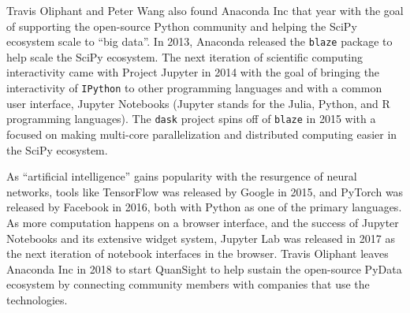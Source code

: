 \documentclass[010-intro.tex]{subfiles}
\begin{document}
        Travis Oliphant and Peter Wang also found Anaconda Inc that year
        with the goal of supporting the open-source Python community and helping the SciPy ecosystem scale to ``big data''. %
        In 2013, Anaconda released the \lstinline{blaze} package to help scale the SciPy ecosystem.
        The next iteration of scientific computing interactivity came with Project Jupyter in 2014
        with the goal of bringing the interactivity of \lstinline{IPython} to other programming languages and with a common user interface,
        Jupyter Notebooks (Jupyter stands for the Julia, Python, and R programming languages).
        The \lstinline{dask} project spins off of \lstinline{blaze} in 2015 with a focused on
        making multi-core parallelization and distributed computing easier in the SciPy ecosystem.

        As ``artificial intelligence'' gains popularity with the resurgence of neural networks,
        tools like TensorFlow was released by Google in 2015,
        and PyTorch was released by Facebook in 2016,
        both with Python as one of the primary languages.
        As more computation happens on a browser interface, and the success of Jupyter Notebooks and its extensive widget system,
        Jupyter Lab was released in 2017 as the next iteration of notebook interfaces in the browser.
        Travis Oliphant leaves Anaconda Inc in 2018 to start QuanSight to help sustain the open-source PyData ecosystem
        by connecting community members with companies that use the technologies.
\end{document}
